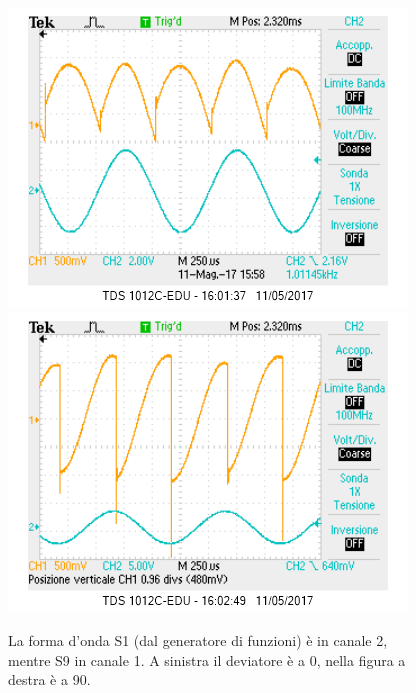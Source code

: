 \documentclass[10pt,a4paper]{article}
\begin{document}
\begin{figure}[!htb]
  \centering
  \includegraphics[scale=0.45]{dev0ch1S9-ch2S1.png}\includegraphics[scale=0.45]{dev90ch1S9-ch2S1.png}
\caption{La forma d'onda S1 (dal generatore di funzioni) è in canale 2, mentre S9 in canale 1. A sinistra il deviatore è a 0\degree, nella figura a destra è a 90\degree. \label{osc:devS9}}
\end{figure}
\end{document}
